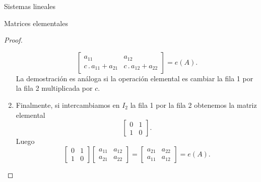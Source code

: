 \documentclass[a4paper,12pt,twoside,spanish]{amsbook}
\theoremstyle{definition}
\theoremstyle{remark}
\begin{document}
\begin{chapter}{Sistemas lineales}
\begin{section}{Matrices elementales}
\begin{proof}
\begin{enumerate}
\begin{equation*}
					\begin{bmatrix} 
					a_{11} &a_{12}\\
					c\,.\,a_{11} + a_{21}&c\,.\,a_{12}+a_{22}\end{bmatrix} = e(A).
					\end{equation*}
					La demostración es análoga si la operación elemental es cambiar la fila 1 por la fila 2 multiplicada por $c$.
					\item Finalmente, si intercambiamos en $I_2$ la fila 1 por la fila 2 obtenemos la matriz elemental
					\begin{equation*}
					\begin{bmatrix} 0& 1\\ 1&0\end{bmatrix}.
					\end{equation*}
					Luego
					\begin{equation*}
					\begin{bmatrix} 0& 1\\ 1&0\end{bmatrix}	\begin{bmatrix} a_{11}&a_{12}\\a_{21}&a_{22}\end{bmatrix} = 
					\begin{bmatrix}
					a_{21} &a_{22}\\
					a_{11} &a_{12}\end{bmatrix} = e(A).
					\end{equation*}
				\end{enumerate}
				

\end{proof}
\end{section}
\end{chapter}
\end{document}
